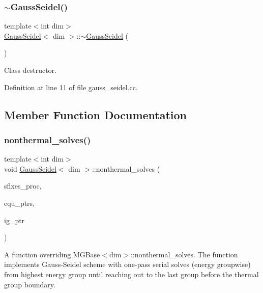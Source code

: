 \subsubsection{\texorpdfstring{$\sim$\+Gauss\+Seidel()}{~GaussSeidel()}}
{\footnotesize\ttfamily template$<$int dim$>$ \\
\hyperlink{class_gauss_seidel}{Gauss\+Seidel}$<$ dim $>$\+::$\sim$\hyperlink{class_gauss_seidel}{Gauss\+Seidel} (\begin{DoxyParamCaption}{ }\end{DoxyParamCaption})}



Class destructor. 



Definition at line 11 of file gauss\+\_\+seidel.\+cc.



\subsection{Member Function Documentation}
\mbox{\label{class_gauss_seidel_a28fc4ef9150773f587f90951c704c994}} 
\subsubsection{\texorpdfstring{nonthermal\+\_\+solves()}{nonthermal\_solves()}}
{\footnotesize\ttfamily template$<$int dim$>$ \\
void \hyperlink{class_gauss_seidel}{Gauss\+Seidel}$<$ dim $>$\+::nonthermal\+\_\+solves (\begin{DoxyParamCaption}\item[{std\+::vector$<$ Vector$<$ double $>$ $>$ \&}]{sflxes\+\_\+proc,  }\item[{std\+::vector$<$ std\+\_\+cxx11\+::shared\+\_\+ptr$<$ \hyperlink{class_equation_base}{Equation\+Base}$<$ dim $>$ $>$ $>$ \&}]{equ\+\_\+ptrs,  }\item[{std\+\_\+cxx11\+::shared\+\_\+ptr$<$ \hyperlink{class_i_g_base}{I\+G\+Base}$<$ dim $>$ $>$}]{ig\+\_\+ptr }\end{DoxyParamCaption})\hspace{0.3cm}{\ttfamily [virtual]}}

A function overriding M\+G\+Base$<$dim$>$\+::nonthermal\+\_\+solves. The function implements Gauss-\/\+Seidel scheme with one-\/pass serial solves (energy groupwise) from highest energy group until reaching out to the last group before the thermal group boundary.


